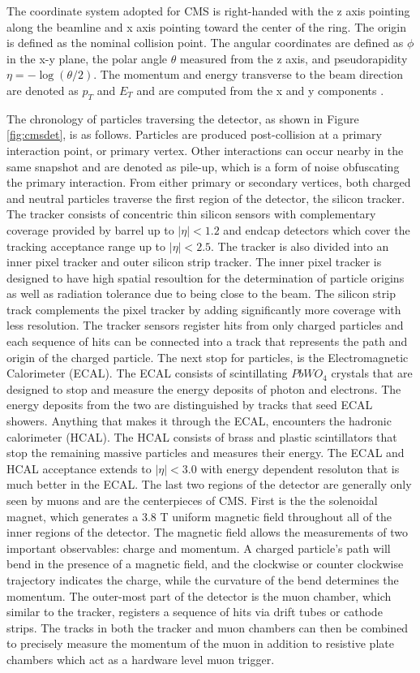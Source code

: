 The coordinate system adopted for CMS is right-handed with the z axis pointing along the beamline and x axis pointing toward the center of the ring. The origin is defined as the nominal collision point. The angular coordinates are defined as $\phi$ in the x-y plane, the polar angle $\theta$ measured from the z axis, and pseudorapidity $\eta =-\log(\theta/2)$. The momentum and energy transverse to the beam direction are denoted as $p_T$ and $E_T$ and are computed from the x and y components \cite{CMS:2017lum}. 

The chronology of particles traversing the detector, as shown in Figure \ref{fig:cmsdet}, is as follows. Particles are produced post-collision at a primary interaction point, or primary vertex. Other interactions can occur nearby in the same snapshot and are denoted as pile-up, which is a form of noise obfuscating the primary interaction. From either primary or secondary vertices, both charged and neutral particles traverse the first region of the detector, the silicon tracker. The tracker consists of concentric thin silicon sensors with complementary coverage provided by barrel up to $|\eta|<1.2$ and endcap detectors which cover the tracking acceptance range up to $|\eta| < 2.5$. The tracker is also divided into an inner pixel tracker and outer silicon strip tracker. The inner pixel tracker is designed to have high spatial resoultion for the determination of particle origins as well as radiation tolerance due to being close to the beam. The silicon strip track complements the pixel tracker by adding significantly more coverage with less resolution. The tracker sensors  register hits from only charged particles and each sequence of hits can be connected into a track that represents the path and origin of the charged particle.  The next stop for particles, is the Electromagnetic Calorimeter (ECAL). The ECAL consists of scintillating $PbWO_4$ crystals that are designed to stop and measure the energy deposits of photon and electrons. The energy deposits from the two  are distinguished by tracks that seed ECAL showers. Anything that makes it through the ECAL, encounters the hadronic calorimeter (HCAL). The HCAL consists of brass and plastic scintillators that stop the remaining massive particles and measures their energy. The ECAL and HCAL acceptance extends to $|\eta| <3.0$ with energy dependent resoluton that is much better in the ECAL. The last two regions of the detector are generally only seen by muons and are the centerpieces of CMS. First is the the solenoidal magnet, which generates a 3.8 T uniform magnetic field throughout all of the inner regions of the detector. The magnetic field allows the measurements of two important observables: charge and momentum.  A charged particle's path will bend in the presence of a magnetic field, and the clockwise or counter clockwise trajectory indicates the charge, while the curvature of the bend determines the momentum. The outer-most part of the detector is the muon chamber, which similar to the tracker, registers a sequence of hits via drift tubes or cathode strips. The tracks in both the tracker and muon chambers can then be combined to precisely measure the momentum of the muon in addition to resistive plate chambers which act as a hardware level muon trigger. 